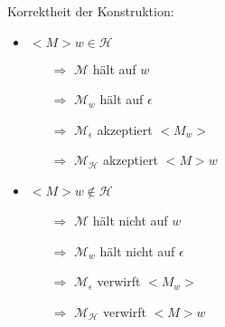 \documentclass{scrartcl}%
\begin{document}
    Korrektheit der Konstruktion:
    \begin{itemize}
        \item $<M>w \in \mathcal{H}$
        \begin{itemize}
            \item [$\Rightarrow$] $\mathcal{M}$ hält auf $w$
            \item [$\Rightarrow$] $\mathcal{M}_w$ hält auf $\epsilon$
            \item [$\Rightarrow$] $\mathcal{M}_\epsilon$ akzeptiert $<M_w>$
            \item [$\Rightarrow$] $\mathcal{M}_\mathcal{H}$ akzeptiert $<M>w$
        \end{itemize}
        \item $<M>w \notin \mathcal{H}$
        \begin{itemize}
            \item [$\Rightarrow$] $\mathcal{M}$ hält nicht auf $w$
            \item [$\Rightarrow$] $\mathcal{M}_w$ hält nicht auf $\epsilon$
            \item [$\Rightarrow$] $\mathcal{M}_\epsilon$ verwirft $<M_w>$
            \item [$\Rightarrow$] $\mathcal{M}_\mathcal{H}$ verwirft $<M>w$
        \end{itemize}
    \end{itemize}

\end{document}
